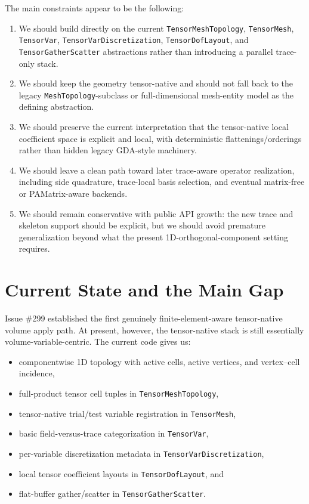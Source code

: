 \documentclass[11pt]{article}
\begin{document}
The main constraints appear to be the following:
\begin{enumerate}[leftmargin=2em]
  \item We should build directly on the current \texttt{TensorMeshTopology}, \texttt{TensorMesh}, \texttt{TensorVar}, \texttt{TensorVarDiscretization}, \texttt{TensorDofLayout}, and \texttt{TensorGatherScatter} abstractions rather than introducing a parallel trace-only stack.
  \item We should keep the geometry tensor-native and should not fall back to the legacy \texttt{MeshTopology}-subclass or full-dimensional mesh-entity model as the defining abstraction.
  \item We should preserve the current interpretation that the tensor-native local coefficient space is explicit and local, with deterministic flattenings/orderings rather than hidden legacy GDA-style machinery.
  \item We should leave a clean path toward later trace-aware operator realization, including side quadrature, trace-local basis selection, and eventual matrix-free or PAMatrix-aware backends.
  \item We should remain conservative with public API growth: the new trace and skeleton support should be explicit, but we should avoid premature generalization beyond what the present 1D-orthogonal-component setting requires.
\end{enumerate}

\section{Current State and the Main Gap}

Issue \#299 established the first genuinely finite-element-aware tensor-native volume apply path. At present, however, the tensor-native stack is still essentially volume-variable-centric. The current code gives us:
\begin{itemize}[leftmargin=2em]
  \item componentwise 1D topology with active cells, active vertices, and vertex--cell incidence,
  \item full-product tensor cell tuples in \texttt{TensorMeshTopology},
  \item tensor-native trial/test variable registration in \texttt{TensorMesh},
  \item basic field-versus-trace categorization in \texttt{TensorVar},
  \item per-variable discretization metadata in \texttt{TensorVarDiscretization},
  \item local tensor coefficient layouts in \texttt{TensorDofLayout}, and
  \item flat-buffer gather/scatter in \texttt{TensorGatherScatter}.
\end{itemize}
\end{document}
